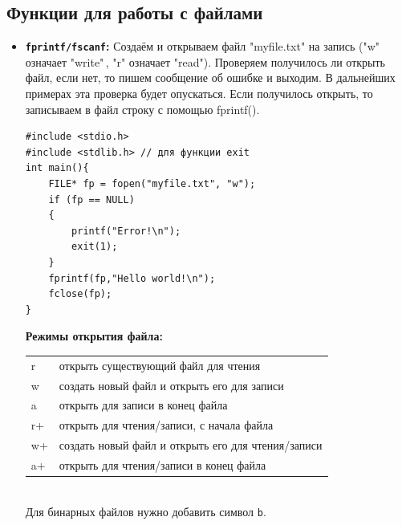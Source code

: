 \documentclass{article}
\begin{document}
\subsection*{Функции для работы с файлами}
\begin{itemize}
\item \textbf{\texttt{fprintf/fscanf}:} Создаём и открываем файл "myfile.txt" на запись ("w" означает "write"\,, "r" означает "read"). Проверяем получилось ли открыть файл, если нет, то пишем сообщение об ошибке и выходим.  В дальнейших примерах эта проверка будет опускаться. Если получилось открыть, то записываем в файл строку с помощью fprintf().
\begin{lstlisting}
#include <stdio.h>
#include <stdlib.h> // для функции exit
int main(){
    FILE* fp = fopen("myfile.txt", "w");
    if (fp == NULL)
    {
        printf("Error!\n");
        exit(1);
    }
    fprintf(fp,"Hello world!\n");
    fclose(fp);
}
\end{lstlisting}

\textbf{Режимы открытия файла:} \\
\begin{tabular}{ | l || l |}
\hline
  r & открыть существующий файл для чтения \\
  w & создать новый файл и открыть его для записи \\
  a & открыть для записи в конец файла \\
  r+ & открыть для чтения/записи, с начала файла  \\
  w+ & создать новый файл и открыть его для чтения/записи \\
  a+ & открыть для чтения/записи в конец файла \\
\hline
\end{tabular}\\
Для бинарных файлов нужно добавить символ \texttt{b}.


\end{itemize}
\end{document}

